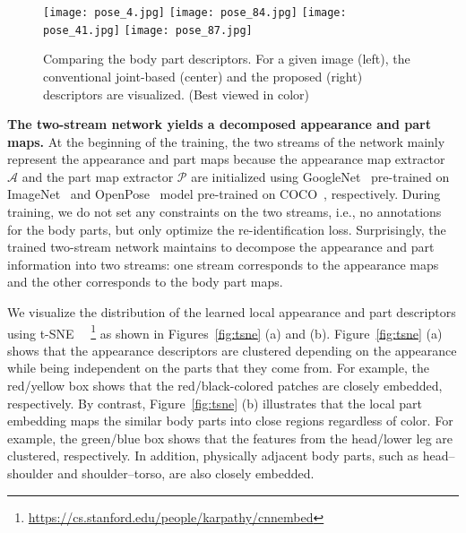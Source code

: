 \documentclass{llncs}
\begin{document}
\begin{figure}[t]
     \begin{minipage}{0.99\linewidth}
\centering
      \texttt{[image: pose\_4.jpg]}
      \texttt{[image: pose\_84.jpg]}
      \texttt{[image: pose\_41.jpg]}
      \texttt{[image: pose\_87.jpg]}
    \end{minipage}
\vspace{-.1cm}
\caption{Comparing the body part descriptors. For a given image (left), the conventional joint-based (center) and the proposed (right) descriptors are visualized. (Best viewed in color)}
\label{fig:posemap_compare}
\vspace{-.5cm}
\end{figure}

\vspace{.1cm}
\noindent\textbf{The two-stream network yields a decomposed appearance and part maps.}
At the beginning of the training, the two streams of the network {\color{black}mainly represent the appearance and part maps because the appearance map extractor $\mathcal{A}$ and the part map extractor $\mathcal{P}$ are initialized using GoogleNet~\cite{googlenet} pre-trained on ImageNet~\cite{imagenet} and OpenPose~\cite{conf/cvpr/cao17} model pre-trained on COCO~\cite{coco}, respectively.}
During training, we do not set any constraints on the two streams, i.e., no annotations for the body parts, but only optimize the re-identification loss. Surprisingly, the trained two-stream network maintains to decompose the appearance and part information into two streams: one stream corresponds to the appearance maps and the other corresponds to the body part maps.

We visualize the distribution of the learned local appearance and part descriptors using t-SNE~\cite{tsne}
~\footnote{\url{https://cs.stanford.edu/people/karpathy/cnnembed}} as shown in Figures~\ref{fig:tsne} (a) and (b). Figure~\ref{fig:tsne} (a) shows that the appearance descriptors are clustered depending on the appearance while being independent on the parts that they come from. For example, the red/yellow box shows that the red/black-colored patches are closely embedded, respectively. By contrast, Figure~\ref{fig:tsne} (b) illustrates that the local part embedding maps the similar body parts into close regions regardless of color. For example, the green/blue box shows that the features from the head/lower leg are clustered, respectively. In addition, physically adjacent body parts, such as head--shoulder and shoulder--torso, are also closely embedded.
\end{document}
